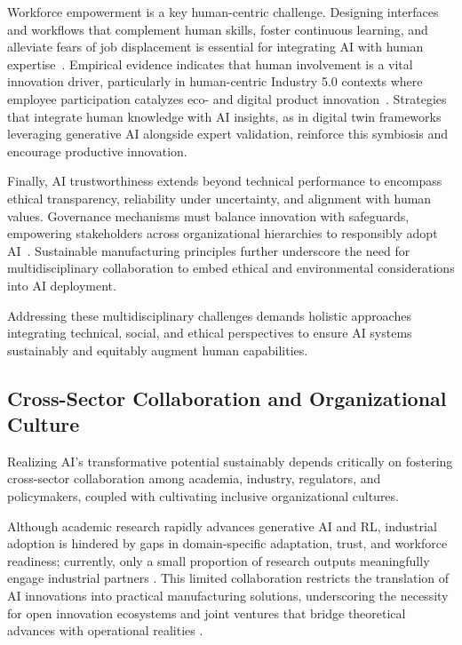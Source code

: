 \documentclass[sigconf]{acmart}
\begin{document}
Workforce empowerment is a key human-centric challenge. Designing interfaces and workflows that complement human skills, foster continuous learning, and alleviate fears of job displacement is essential for integrating AI with human expertise~\cite{ref2,ref22}. Empirical evidence indicates that human involvement is a vital innovation driver, particularly in human-centric Industry 5.0 contexts where employee participation catalyzes eco- and digital product innovation~\cite{ref22}. Strategies that integrate human knowledge with AI insights, as in digital twin frameworks leveraging generative AI alongside expert validation, reinforce this symbiosis and encourage productive innovation.

Finally, AI trustworthiness extends beyond technical performance to encompass ethical transparency, reliability under uncertainty, and alignment with human values. Governance mechanisms must balance innovation with safeguards, empowering stakeholders across organizational hierarchies to responsibly adopt AI~\cite{ref41}. Sustainable manufacturing principles further underscore the need for multidisciplinary collaboration to embed ethical and environmental considerations into AI deployment.

Addressing these multidisciplinary challenges demands holistic approaches integrating technical, social, and ethical perspectives to ensure AI systems sustainably and equitably augment human capabilities.

\subsection{Cross-Sector Collaboration and Organizational Culture}

Realizing AI’s transformative potential sustainably depends critically on fostering cross-sector collaboration among academia, industry, regulators, and policymakers, coupled with cultivating inclusive organizational cultures.

Although academic research rapidly advances generative AI and RL, industrial adoption is hindered by gaps in domain-specific adaptation, trust, and workforce readiness; currently, only a small proportion of research outputs meaningfully engage industrial partners \cite{ref7}. This limited collaboration restricts the translation of AI innovations into practical manufacturing solutions, underscoring the necessity for open innovation ecosystems and joint ventures that bridge theoretical advances with operational realities \cite{ref3}.
\end{document}
